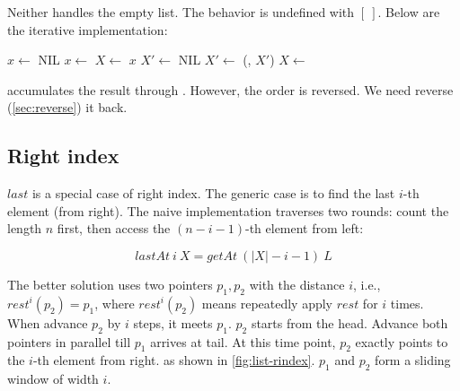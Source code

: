 \documentclass[b5paper]{article}
\begin{document}
Neither handles the empty list. The behavior is undefined with $[\ ]$. Below are the iterative implementation:

\begin{algorithmic}[1]
  \State $x \gets $ NIL
    \State $x \gets $ 
    \State $X \gets $ 
  \EndWhile
  \State \Return $x$
\EndFunction
\Statex
{}
  \State $X' \gets $ NIL
   
    \State $X' \gets$ (, $X'$)
    \State $X \gets $ 
  \EndWhile
  \State \Return {}
\EndFunction
\end{algorithmic}

 accumulates the result through . However, the order is reversed. We need reverse (\cref{sec:reverse}) it back.

\subsection{Right index}
 

$last$ is a special case of right index. The generic case is to find the last $i$-th element (from right). The naive implementation traverses two rounds: count the length $n$ first, then access the $(n - i - 1)$-th element from left:

\[
  lastAt\ i\ X = getAt\ (|X| - i - 1)\ L
\]

The better solution uses two pointers $p_1, p_2$ with the distance $i$, i.e., $rest^i(p_2) = p_1$, where $rest^i(p_2)$ means repeatedly apply $rest$ for $i$ times. When advance $p_2$ by $i$ steps, it meets $p_1$. $p_2$ starts from the head. Advance both pointers in parallel till $p_1$ arrives at tail. At this time point, $p_2$ exactly points to the $i$-th element from right. as shown in \cref{fig:list-rindex}. $p_1$ and $p_2$ form a sliding window of width $i$.
\end{document}

